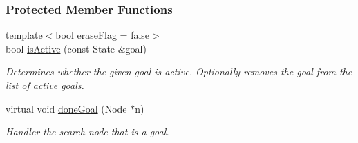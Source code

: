 \subsubsection*{Protected Member Functions}
\begin{DoxyCompactItemize}
\item 
{\footnotesize template$<$bool erase\+Flag = false$>$ }\\bool \hyperlink{structslb_1_1ext_1_1policy_1_1goalHandler_1_1MultipleGoal_acdb94b8e9f035fbdb3ea45188964abfa}{is\+Active} (const State \&goal)
\begin{DoxyCompactList}\small\item\em Determines whether the given goal is active. Optionally removes the goal from the list of active goals. \end{DoxyCompactList}\item 
virtual void \hyperlink{structslb_1_1ext_1_1policy_1_1goalHandler_1_1MultipleGoal_ab142add8215deea2aa12efb093f2b240}{done\+Goal} (Node $\ast$n)
\begin{DoxyCompactList}\small\item\em Handler the search node that is a goal. \end{DoxyCompactList}\end{DoxyCompactItemize}
